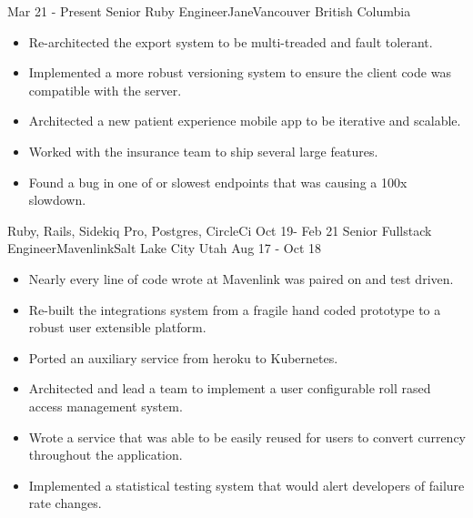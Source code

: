 %
%
%

\begin{experiences}
  \experience
    {Mar 21 - Present}   {Senior Ruby Engineer}{Jane}{Vancouver British Columbia}
    {} {
        \begin{itemize}
          \item Re-architected the export system to be multi-treaded and fault tolerant. 
          \item Implemented a more robust versioning system to ensure the client code was compatible with the server.
          \item Architected a new patient experience mobile app to be iterative and scalable.
          \item Worked with the insurance team to ship several large features.
          \item Found a bug in one of or slowest endpoints that was causing a 100x slowdown.
        \end{itemize}
      }
      {Ruby, Rails, Sidekiq Pro, Postgres, CircleCi}
  \emptySeparator
  \experience
    {Oct 19- Feb 21} {Senior Fullstack Engineer}{Mavenlink}{Salt Lake City Utah}
    {Aug 17 - Oct 18} {
                      \begin{itemize}
                        \item Nearly every line of code wrote at Mavenlink was paired on and test driven.
                        \item Re-built the integrations system from a fragile hand coded prototype to a robust user extensible platform.
                        \item Ported an auxiliary service from heroku to Kubernetes.
                        \item Architected and lead a team to implement a user configurable roll rased access management system. 
                        \item Wrote a service that was able to be easily reused for users to convert currency throughout the application.
                        \item Implemented a statistical testing system that would alert developers of failure rate changes.

\end{itemize}}
\end{experiences}
